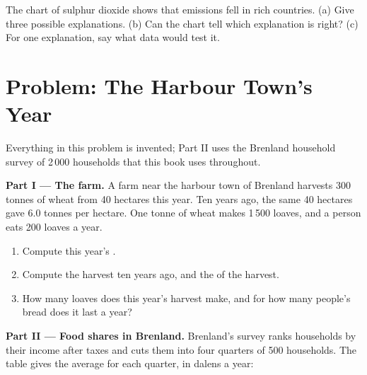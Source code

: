 \begin{exercise}[$\star\star\star$]\label{exo:g6:food-and-energy:12}
The chart of sulphur dioxide shows that emissions fell in rich countries. (a) Give
three possible explanations. (b) Can the chart tell which explanation is right?
(c) For one explanation, say what data would test it.
\end{exercise}

\section{Problem: The Harbour Town's Year}

\begin{problem}
\label{pb:g6:food-and-energy:1}
Everything in this problem is invented; Part II uses the Brenland household
survey of 2\,000 households that this book uses throughout.

\medskip
\noindent\textbf{Part I --- The farm.} A farm near the harbour town of Brenland
harvests 300 tonnes of wheat from 40 hectares this year. Ten years ago, the same
40 hectares gave $6.0$ tonnes per hectare. One tonne of wheat makes 1\,500 loaves,
and a person eats 200 loaves a year.
\begin{enumerate}
  \item Compute this year's .
  \item Compute the harvest ten years ago, and the  of the harvest.
  \item How many loaves does this year's harvest make, and for how many people's
        bread does it last a year?
\end{enumerate}

\medskip
\noindent\textbf{Part II --- Food shares in Brenland.} Brenland's survey ranks
households by their income after taxes and cuts them into four quarters of 500
households. The table gives the average for each quarter, in dalens a year:


\end{problem}
